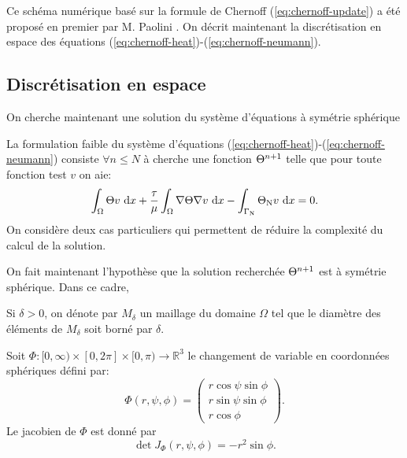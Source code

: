 Ce schéma numérique basé sur la formule de Chernoff
(\ref{eq:chernoff-update}) a été proposé en premier par M. Paolini
\cite{Paolini1988}. On décrit maintenant la discrétisation en
espace des équations (\ref{eq:chernoff-heat})-(\ref{eq:chernoff-neumann}).


\subsection*{Discrétisation en espace}
On cherche maintenant une solution du système d'équations à symétrie
sphérique

La formulation faible du système d'équations
(\ref{eq:chernoff-heat})-(\ref{eq:chernoff-neumann}) consiste $\forall
n\leq N$ à cherche une fonction $\Theta^{n+1}$ telle que pour
toute fonction test $v$ on aie:
\begin{equation}
  \int_\Omega \temperature v\,\intd{x} + \frac{\tau}{\mu} %
  \int_\Omega \nabla \temperature \nabla v\,\intd{x} - %
  \int_{\Gamma_\mathrm{N}} \temperature_\mathrm{N}v\,\intd{x} %
  = 0.
\end{equation}
On considère deux cas particuliers qui permettent de réduire
la complexité du calcul de la solution.

On fait maintenant l'hypothèse que la solution recherchée
$\Theta^{n+1}$ est à symétrie sphérique. Dans ce cadre,

Si $\delta > 0$, on dénote par $M_\delta$ un maillage du domaine
$\Omega$ tel que le diamètre des éléments de $M_\delta$ soit borné par
$\delta$.






Soit $\Phi:[0,\infty)\times[0,2\pi]\times[0,\pi)\to\mathbb R^3$ le
changement de variable en coordonnées sphériques défini par:
\begin{equation}
  \Phi(r, \psi, \phi) = \begin{pmatrix}
    r\cos\psi\sin\phi\\
    r\sin\psi\sin\phi\\
    r\cos\phi
  \end{pmatrix}.
\end{equation}
Le jacobien de $\Phi$ est donné par
\begin{equation}
  \det J_\Phi(r, \psi,\phi) = -r^2\sin\phi.
\end{equation}

